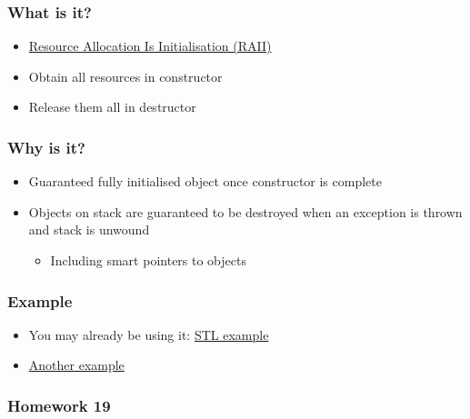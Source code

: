 \subsubsection{What is it?}\label{what-is-it-1}

\begin{itemize}
\itemsep1pt\parskip0pt
\item
  \href{https://en.wikipedia.org/wiki/Resource_Acquisition_Is_Initialization}{Resource
  Allocation Is Initialisation (RAII)}
\item
  Obtain all resources in constructor
\item
  Release them all in destructor
\end{itemize}

\subsubsection{Why is it?}\label{why-is-it}

\begin{itemize}
\itemsep1pt\parskip0pt
\item
  Guaranteed fully initialised object once constructor is complete
\item
  Objects on stack are guaranteed to be destroyed when an exception is
  thrown and stack is unwound

  \begin{itemize}
  \itemsep1pt\parskip0pt
  \item
    Including smart pointers to objects
  \end{itemize}
\end{itemize}

\subsubsection{Example}\label{example-1}

\begin{itemize}
\itemsep1pt\parskip0pt
\item
  You may already be using it:
  \href{https://en.wikipedia.org/wiki/Resource_Acquisition_Is_Initialization}{STL
  example}
\item
  \href{https://en.wikibooks.org/wiki/More_C\%2B\%2B_Idioms/Resource_Acquisition_Is_Initialization}{Another
  example}
\end{itemize}

\subsubsection{Homework 19}\label{homework-19}

